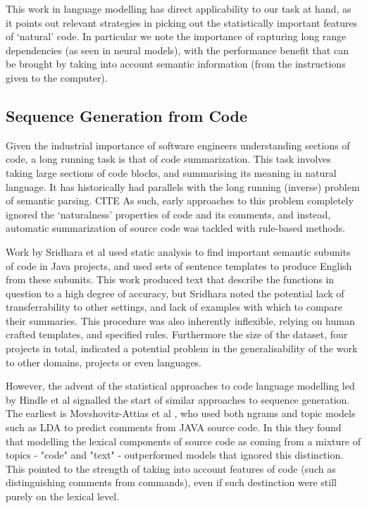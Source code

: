 This work in language modelling has direct applicability to our task at hand, as it points out relevant strategies in picking out the statistically important features of `natural' code. In particular we note the importance of capturing long range dependencies (as seen in neural models), with the performance benefit that can be brought by taking into account semantic information (from the instructions given to the computer).

\subsection{Sequence Generation from Code}

Given the industrial importance of software engineers understanding sections of code, a long running task is that of code summarization. 
This task involves taking large sections of code blocks, and summarising its meaning in natural language. It has historically had parallels with the long running (inverse) problem of semantic parsing. CITE
As such, early approaches to this problem completely ignored the `naturalness' properties of code and its comments, and instead, automatic summarization of source code was tackled with rule-based methods. 

Work by Sridhara et al \cite{sridhara_[not_2010}  used static analysis to find important semantic subunits of code in Java projects, and used sets of sentence templates to produce English from these subunits.
This work produced text that describe the functions in question to a high degree of accuracy, but Sridhara noted the potential lack of transferrability to other settings, and lack of examples with which to compare their summaries.  
This procedure was also inherently inflexible, relying on human crafted templates, and specified rules. Furthermore the size of the dataset, four projects in total, indicated a potential problem in the generalisability of the work to other domains, projects or even languages.

However, the advent of the statistical approaches to code language modelling led by Hindle et al \cite{hindle_naturalness_nodate} signalled the start of similar approaches to sequence generation. The earliest is Movshovitz-Attias et al \cite{movshovitz-attias_natural_nodate}, who used both ngrams and topic models such as LDA to predict comments from JAVA source code. In this they found that modelling the lexical components of source code as coming from a mixture of topics - "code" and "text" - outperformed models that ignored this distinction.  This pointed to the strength of taking into account features of code (such as distinguishing comments from commands), even if such destinction were still purely on the lexical level.

